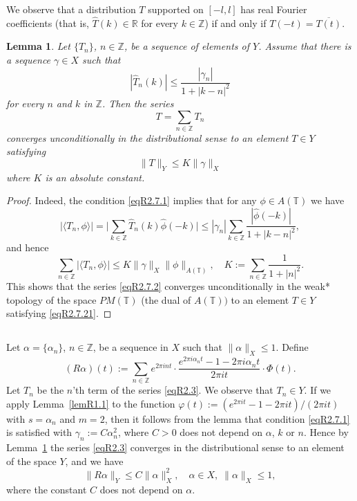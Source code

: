 \documentclass[reqno,a4paper,12pt]{amsart}
\numberwithin{equation}{section}
\numberwithin{figure}{section}
\newcommand\R{\mathbb{R}}
\newcommand\Z{\mathbb{Z}}
\newcommand\T{\mathbb{T}}
\newcommand\gam{\gamma}
\newcommand\1{\mathds{1}}
\renewcommand\leq{\leqslant}
\newcommand{\ft}[1]{\widehat{#1}}
\newcommand{\dotprod}[2]{\langle #1 , #2 \rangle}
\theoremstyle{plain}
\newtheorem{lem}[thm]{Lemma}
\newcommand{\lemref}[1]{Lemma~\ref{#1}}
\theoremstyle{definition}
\begin{document}
We observe that a distribution $T$
supported on $[-l,l]$ has real Fourier coefficients
(that is, $\ft{T}(k) \in \R$ for every
 $k \in \Z$) if and only if $T(-t) = \overline{T(t)}$.




\begin{lem}
  \label{lemR2.7}
Let $\{T_n\}$, $n \in \Z$, be a sequence of elements
of $Y$. Assume that there is 
a sequence $\gam \in X$ such that
\begin{equation}
\label{eqR2.7.1}
|\ft{T}_n(k)| \leq \frac{|\gam_n|}{1+|k-n|^2}
\end{equation}
for every $n$ and $k$ in $\Z$.
Then the series  
\begin{equation}
\label{eqR2.7.2}
T=\sum_{n \in \Z} T_n
\end{equation}
converges unconditionally in the distributional sense
to an element $T \in Y$
satisfying 
\begin{equation}
\label{eqR2.7.21}
\|T\|_Y \leq K \|\gam\|_X
\end{equation}
where $K$ is an absolute constant.
\end{lem}


\begin{proof}
Indeed, the condition
\eqref{eqR2.7.1} implies that
for any $\phi \in A(\T)$  we have
\[
 |\dotprod{T_n}{\phi}|
=  \Big| \sum_{k \in \Z} \ft{T}_n(k) \ft{\phi}(-k) \Big|
\leq |\gam_n| \sum_{k \in \Z} \frac{|\ft{\phi}(-k)|}{1+|k-n|^2},
\]
and hence
\[
\sum_{n \in \Z} |\dotprod{T_n}{\phi}|
\leq K \|\gamma\|_X \|\phi\|_{A(\T)},
\quad
K := \sum_{n \in \Z} \frac{1}{1+|n|^2}.
\]
This shows that
the series   \eqref{eqR2.7.2}
converges unconditionally in the weak* topology
of the space $PM(\T)$ (the dual of $A(\T))$
to an element $T \in Y$ satisfying 
\eqref{eqR2.7.21}.
\end{proof}



\subsection{}
Let $\alpha = \{\alpha_n\}$, $n \in \Z$, be a  sequence  in $X$
such that $\|\alpha\|_X \leq 1$. Define 
\begin{equation}
\label{eqR2.3}
(R \alpha)(t):=\sum_{n\in\mathbb Z} e^{2\pi int}\cdot \frac{e^{2\pi i\alpha_n t}-1-2\pi i\alpha_n t}{2\pi it} \cdot \Phi(t).
\end{equation}
Let $T_n$ be the $n$'th term of the series
\eqref{eqR2.3}. We observe that $T_n \in Y$.
 If we apply \lemref{lemR1.1} to the function
$\varphi(t) :=  (e^{2\pi i t}-1 -  2 \pi i t)/(2\pi it)$
with $s = \alpha_n$ and $m=2$, then
it follows from the lemma that
 condition \eqref{eqR2.7.1} is satisfied
with $\gam_n := C \alpha_n^2$,
 where $C>0$ does not
 depend on $\alpha$, $k$ or $n$.
Hence by \lemref{lemR2.7} 
the series \eqref{eqR2.3} converges
in the distributional sense to an
element of  the space $Y$,
and we have
\begin{equation}
\label{eqR2.4.1}
\|R \alpha\|_Y \leq C \|\alpha\|^2_X,
\quad \alpha \in X, \; \|\alpha\|_X \leq 1,
\end{equation}
where the constant $C$ does not depend on $\alpha$.
\end{document}
